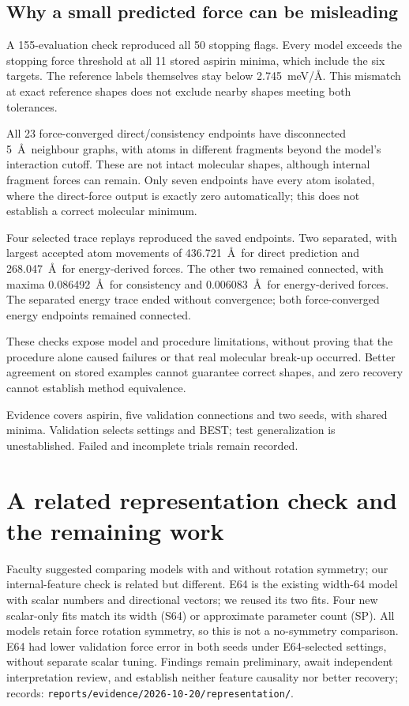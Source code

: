 \documentclass{article}
\begin{document}
\subsection{Why a small predicted force can be misleading}
A 155-evaluation check reproduced all 50 stopping flags. Every model exceeds the stopping force threshold at all 11 stored aspirin minima, which include the six targets. The reference labels themselves stay below 2.745~meV/\AA. This mismatch at exact reference shapes does not exclude nearby shapes meeting both tolerances.

All 23 force-converged direct/consistency endpoints have disconnected 5~\AA\ neighbour graphs, with atoms in different fragments beyond the model's interaction cutoff. These are not intact molecular shapes, although internal fragment forces can remain. Only seven endpoints have every atom isolated, where the direct-force output is exactly zero automatically; this does not establish a correct molecular minimum.

Four selected trace replays reproduced the saved endpoints. Two separated, with largest accepted atom movements of 436.721~\AA\ for direct prediction and 268.047~\AA\ for energy-derived forces. The other two remained connected, with maxima 0.086492~\AA\ for consistency and 0.006083~\AA\ for energy-derived forces. The separated energy trace ended without convergence; both force-converged energy endpoints remained connected.

These checks expose model and procedure limitations, without proving that the procedure alone caused failures or that real molecular break-up occurred. Better agreement on stored examples cannot guarantee correct shapes, and zero recovery cannot establish method equivalence.

Evidence covers aspirin, five validation connections and two seeds, with shared minima. Validation selects settings and BEST; test generalization is unestablished. Failed and incomplete trials remain recorded.

\section{A related representation check and the remaining work}
Faculty suggested comparing models with and without rotation symmetry; our internal-feature check is related but different. E64 is the existing width-64 model with scalar numbers and directional vectors; we reused its two fits. Four new scalar-only fits match its width (S64) or approximate parameter count (SP). All models retain force rotation symmetry, so this is not a no-symmetry comparison. E64 had lower validation force error in both seeds under E64-selected settings, without separate scalar tuning. Findings remain preliminary, await independent interpretation review, and establish neither feature causality nor better recovery; records: \nolinkurl{reports/evidence/2026-10-20/representation/}.
\end{document}
